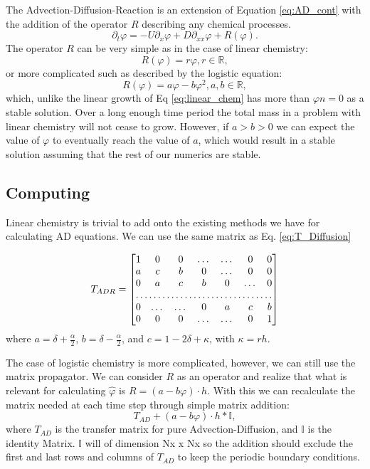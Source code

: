 \documentclass[]{article}
\begin{document}
The Advection-Diffusion-Reaction is an extension of Equation \ref{eq:AD_cont} with the addition of the operator $R$ describing any chemical processes.
\begin{equation}
\partial_t \varphi = -U \partial_x \varphi + D \partial_{xx}\varphi + R(\varphi).
\label{eq:ADR_cont}
\end{equation}
The operator $R$ can be very simple as in the case of linear chemistry:
\begin{equation}
R(\varphi) = r \varphi, r \in \mathbb{R},
\label{eq:linear_chem}
\end{equation}
or more complicated such as described by the logistic equation:
\begin{equation}
R(\varphi) = a \varphi-b \varphi^2, a,b \in \mathbb{R},
\label{eq:chem_logis}
\end{equation}
which, unlike the linear growth of Eq \ref{eq:linear_chem} has more than $\varphi  n= 0$ as a stable solution. Over a long enough time period the total mass in a problem with linear chemistry will not cease to grow. However, if $a > b > 0$ we can expect the value of $\varphi$ to eventually reach the value of $a$, which would result in a stable solution assuming that the rest of our numerics are stable. 

\subsection{Computing}
Linear chemistry is trivial to add onto the existing methods we have for calculating AD equations. We can use the same matrix as Eq. \ref{eq:T_Diffusion}

\begin{equation}
T_{ADR}=\begin{bmatrix} 
1       & 0 & 0 &\dots& \dots &0&0 \\
a      & c & b & 0&\dots & 0 &0\\
0& a & c & b & 0 &\dots & 0 \\
\hdotsfor{7} \\
0 &\dots & \dots & 0&a & c & b  \\
0     &0  & 0 & \dots&\dots & 0&1
\end{bmatrix}
\label{eq:T_Diffusion_2}
\end{equation}
where $a = \delta +\frac{\alpha}{2}$, $b =\delta-\frac{\alpha}{2}$, and $c=1-2\delta +\kappa$, with $\kappa = r h$. 

The case of logistic chemistry is more complicated, however, we can still use the matrix propagator. We can consider $R$ as an operator and realize that what is relevant for calculating $\hat{\varphi}$ is $R = (a - b \varphi) \cdot h$. With this we can recalculate the matrix needed at each time step through simple matrix addition:
\begin{equation}
T_{AD} + (a - b \varphi) \cdot h * \mathbb{I},
\end{equation}
where $T_{AD}$ is the transfer matrix for pure Advection-Diffusion, and $\mathbb{I}$ is the identity Matrix. $\mathbb{I}$ will of dimension Nx x Nx so the addition should exclude the first and last rows and columns of $T_{AD}$ to keep the periodic boundary conditions. 
\end{document}
